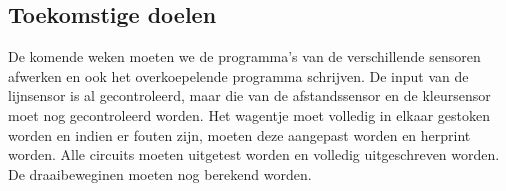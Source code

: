 \documentclass[kulak]{kulakarticle} %
\begin{document}
\subsection{Toekomstige doelen}
De komende weken moeten we de programma's van de verschillende sensoren afwerken en ook het overkoepelende programma schrijven. De input van de lijnsensor is al gecontroleerd, maar die van de afstandssensor en de kleursensor moet nog gecontroleerd worden. Het wagentje moet volledig in elkaar gestoken worden en indien er fouten zijn, moeten deze aangepast worden en herprint worden. Alle circuits moeten uitgetest worden en volledig uitgeschreven worden. De draaibeweginen moeten nog berekend worden. 
\end{document}
